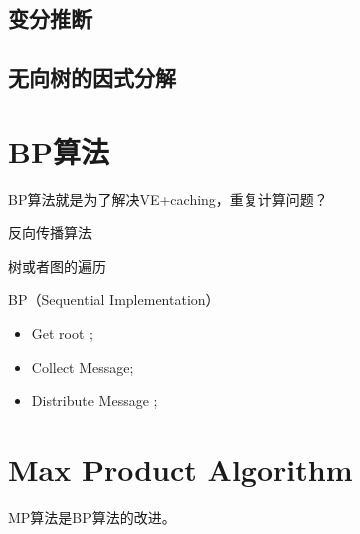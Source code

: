 \subsection*{变分推断}

\subsection*{无向树的因式分解}

\section{BP算法}

BP算法就是为了解决VE+caching，重复计算问题？

反向传播算法

树或者图的遍历

BP（Sequential Implementation）
\begin{itemize}[itemindent=2em]
    \item Get root ;
    \item Collect Message;
    \item Distribute Message ;
\end{itemize}

\section{Max Product Algorithm}

MP算法是BP算法的改进。